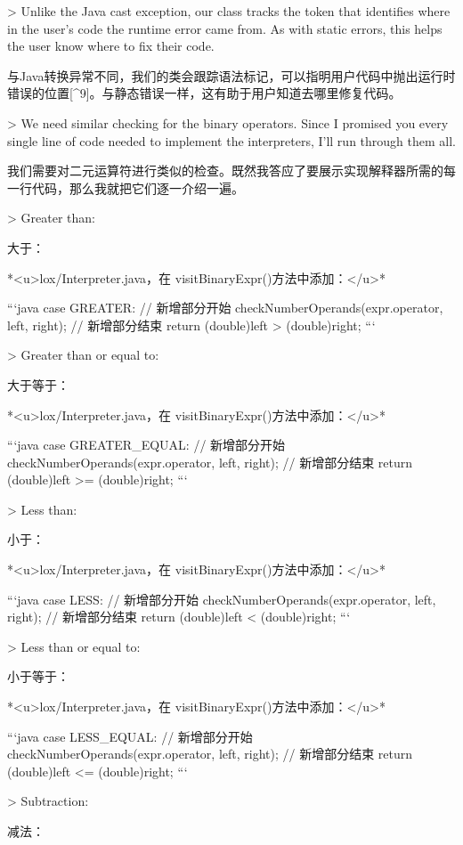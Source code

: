 \documentclass[cn,11pt,chinese]{elegantbook}
\begin{document}
{{{{> Unlike the Java cast exception, our class tracks the token that identifies where in the user’s code the runtime error came from. As with static errors, this helps the user know where to fix their code.

与Java转换异常不同，我们的类会跟踪语法标记，可以指明用户代码中抛出运行时错误的位置[^9]。与静态错误一样，这有助于用户知道去哪里修复代码。

> We need similar checking for the binary operators. Since I promised you every single line of code needed to implement the interpreters, I’ll run through them all.

我们需要对二元运算符进行类似的检查。既然我答应了要展示实现解释器所需的每一行代码，那么我就把它们逐一介绍一遍。

> Greater than:

大于：

*<u>lox/Interpreter.java，在 visitBinaryExpr()方法中添加：</u>*

```java
      case GREATER:  
				// 新增部分开始
        checkNumberOperands(expr.operator, left, right);
        // 新增部分结束
        return (double)left > (double)right;
```

> Greater than or equal to:

大于等于：

*<u>lox/Interpreter.java，在 visitBinaryExpr()方法中添加：</u>*

```java
      case GREATER_EQUAL:  
				// 新增部分开始
        checkNumberOperands(expr.operator, left, right);
        // 新增部分结束
        return (double)left >= (double)right;
```

> Less than:

小于：

*<u>lox/Interpreter.java，在 visitBinaryExpr()方法中添加：</u>*

```java
      case LESS:  
				// 新增部分开始
        checkNumberOperands(expr.operator, left, right);
        // 新增部分结束
        return (double)left < (double)right;
```

> Less than or equal to:

小于等于：

*<u>lox/Interpreter.java，在 visitBinaryExpr()方法中添加：</u>*

```java
      case LESS_EQUAL:  
				// 新增部分开始
        checkNumberOperands(expr.operator, left, right);
        // 新增部分结束
        return (double)left <= (double)right;
```

> Subtraction:

减法：

}}}}
\end{document}
